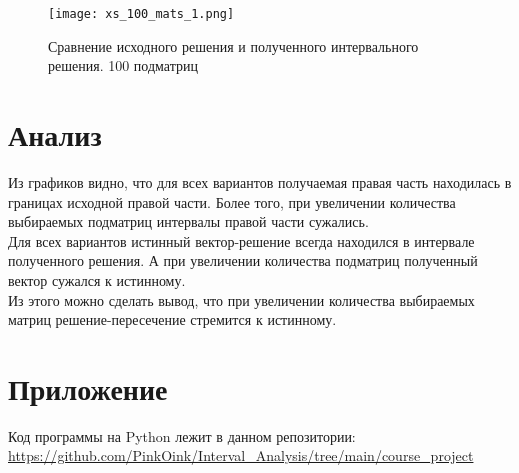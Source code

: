 \begin{figure}[h]
	\centering
	\texttt{[image: xs\_100\_mats\_1.png]}
	\caption{Сравнение исходного решения и полученного интервального решения. 100 подматриц}
\end{figure}
\newpage


\section{Анализ}
Из графиков видно, что для всех вариантов получаемая правая часть находилась в границах исходной правой части. Более того, при увеличении количества выбираемых подматриц интервалы правой части сужались. \\

Для всех вариантов истинный вектор-решение всегда находился в интервале полученного решения. А при увеличении количества подматриц полученный вектор сужался к истинному. \\

Из этого можно сделать вывод, что при увеличении количества выбираемых матриц решение-пересечение стремится к истинному.



\section{Приложение}
Код программы на Python лежит в данном репозитории: \\
\url{https://github.com/PinkOink/Interval_Analysis/tree/main/course_project}{}



